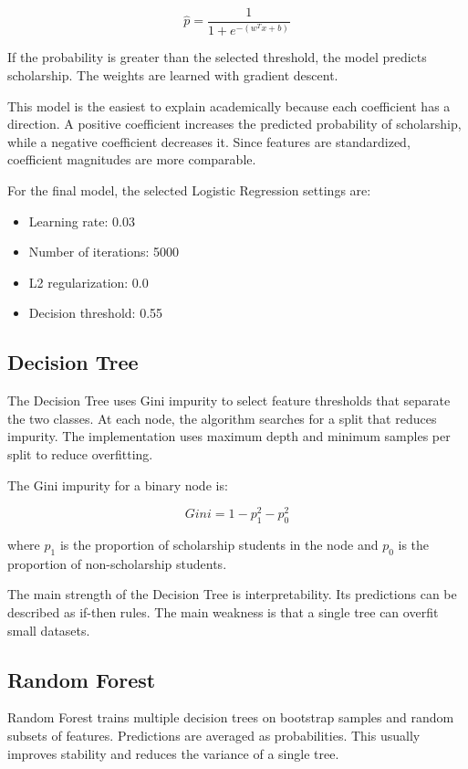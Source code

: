 ﻿\documentclass[12pt,a4paper]{article}
\begin{document}
\[
    \hat{p} = \frac{1}{1 + e^{-(w^Tx + b)}}
\]

If the probability is greater than the selected threshold, the model predicts scholarship. The weights are learned with gradient descent.

This model is the easiest to explain academically because each coefficient has a direction. A positive coefficient increases the predicted probability of scholarship, while a negative coefficient decreases it. Since features are standardized, coefficient magnitudes are more comparable.

For the final model, the selected Logistic Regression settings are:

\begin{itemize}
    \item Learning rate: 0.03
    \item Number of iterations: 5000
    \item L2 regularization: 0.0
    \item Decision threshold: 0.55
\end{itemize}

\clearpage

\subsection{Decision Tree}

The Decision Tree uses Gini impurity to select feature thresholds that separate the two classes. At each node, the algorithm searches for a split that reduces impurity. The implementation uses maximum depth and minimum samples per split to reduce overfitting.

The Gini impurity for a binary node is:

\[
    Gini = 1 - p_1^2 - p_0^2
\]

where \(p_1\) is the proportion of scholarship students in the node and \(p_0\) is the proportion of non-scholarship students.

The main strength of the Decision Tree is interpretability. Its predictions can be described as if-then rules. The main weakness is that a single tree can overfit small datasets.

\clearpage

\subsection{Random Forest}

Random Forest trains multiple decision trees on bootstrap samples and random subsets of features. Predictions are averaged as probabilities. This usually improves stability and reduces the variance of a single tree.
\end{document}
